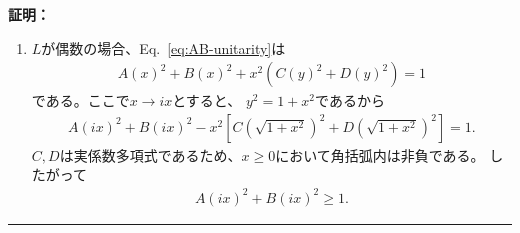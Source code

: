 \documentclass[a4paper,10.5pt]{article}
\numberwithin{equation}{section}
\newenvironment{proofbox}
{\begin{prooflabel}\textbf{証明：}\end{prooflabel}\vspace{0.8em}}
{\par\vspace{1em}\hrule\vspace{1em}}
\begin{document}
\begin{proofbox}
\begin{enumerate}
        \item $L$が偶数の場合、Eq.~\eqref{eq:AB-unitarity}は
        \begin{align*}
            A(x)^2+B(x)^2
            +x^2\left(C(y)^2+D(y)^2\right)=1
        \end{align*}
        である。ここで$x\to ix$とすると、
        $y^2=1+x^2$であるから
        \begin{align*}
            A(ix)^2+B(ix)^2
            -x^2\left[
                C\!\left(\sqrt{1+x^2}\right)^2
                +D\!\left(\sqrt{1+x^2}\right)^2
            \right]
            =1.
        \end{align*}
        $C,D$は実係数多項式であるため、$x\geq0$において角括弧内は非負である。
        したがって
        \begin{align*}
            A(ix)^2+B(ix)^2\geq1.
        \end{align*}
    \end{enumerate}
\end{proofbox}
\end{document}
